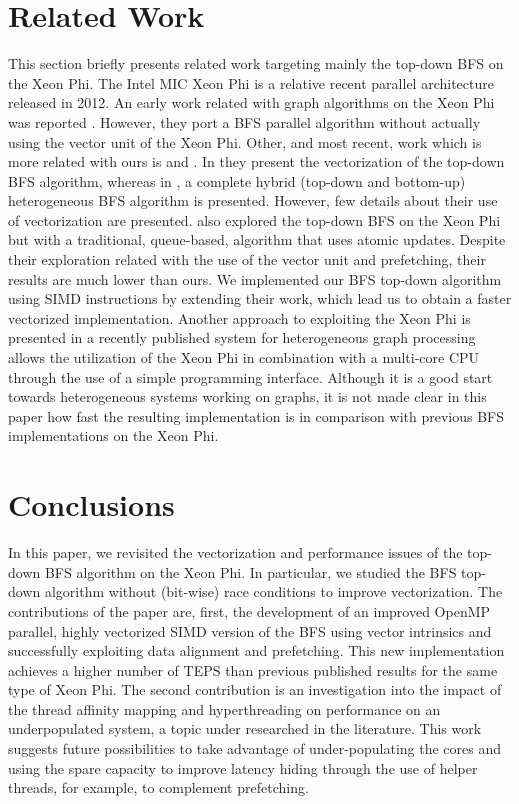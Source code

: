 \documentclass{sig-alternate-05-2015}
\begin{document}
\section{Related Work}
\label{relwork}
This section briefly presents related work targeting mainly the
top-down BFS on the Xeon Phi. The Intel MIC Xeon Phi is a relative
recent parallel architecture released in 2012. An early work related
with graph algorithms on the Xeon Phi was reported
\cite{SauleC12}. However, they port a BFS parallel algorithm without
actually using the vector unit of the Xeon Phi. Other, and most
recent, work which is more related with ours is \cite{Gao2013} and
\cite{MICgraphs}. In \cite{Gao2013} they present the vectorization of
the top-down BFS algorithm, whereas in \cite{MICgraphs}, a complete
hybrid (top-down and bottom-up) heterogeneous BFS algorithm is
presented. However, few details about their use of vectorization are
presented. \cite{stanic2014} also explored the top-down BFS on the Xeon Phi but with a traditional, queue-based, algorithm that uses atomic updates. Despite their exploration related with the use of the vector unit and prefetching, their results are much lower than ours. We implemented our BFS top-down algorithm using SIMD
instructions by extending their work, which lead us to obtain a faster
vectorized implementation. Another approach to exploiting the Xeon
Phi is presented in a recently published system for heterogeneous
graph processing \cite{ChenHRJA15} allows the utilization of the Xeon
Phi in combination with a multi-core CPU through the use of a simple
programming interface. Although it is a good start towards
heterogeneous systems working on graphs, it is not made clear in this
paper how fast the resulting implementation is in comparison with
previous BFS implementations on the Xeon Phi.










\section{Conclusions}
\label{sec:conc}
In this paper, we revisited the vectorization and performance issues
of the top-down BFS algorithm on the Xeon Phi. In particular, we
studied the BFS top-down algorithm without (bit-wise) race conditions
to improve vectorization. The contributions of the paper are, first,
the development of an improved OpenMP parallel, highly vectorized SIMD
version of the BFS using vector intrinsics and successfully exploiting
data alignment and prefetching. This new implementation achieves a
higher number of TEPS than previous published results for the same
type of Xeon Phi. The second contribution is an investigation into the
impact of the thread affinity mapping and hyperthreading on
performance on an underpopulated system, a topic under researched in
the literature. This work suggests future possibilities to take
advantage of under-populating the cores and using the spare capacity
to improve latency hiding through the use of helper threads, for
example, to complement prefetching.
\end{document}
